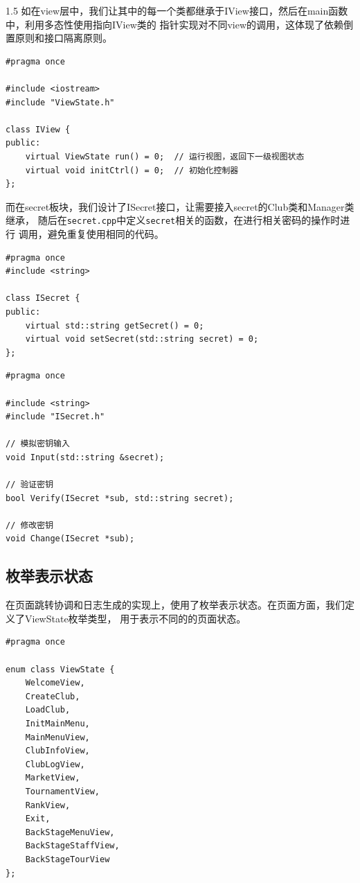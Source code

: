 \documentclass[a4paper]{article}
\begin{document}
\begin{spacing}{1.5}
            如在view层中，我们让其中的每一个类都继承于IView接口，然后在main函数中，利用多态性使用指向IView类的
            指针实现对不同view的调用，这体现了依赖倒置原则和接口隔离原则。

            \begin{lstlisting}[caption=IView接口定义]
#pragma once

#include <iostream>
#include "ViewState.h"

class IView {
public:
    virtual ViewState run() = 0;  // 运行视图，返回下一级视图状态
    virtual void initCtrl() = 0;  // 初始化控制器
};

            \end{lstlisting}
            而在secret板块，我们设计了ISecret接口，让需要接入secret的Club类和Manager类继承，
            随后在\verb|secret.cpp|中定义\verb|secret|相关的函数，在进行相关密码的操作时进行
            调用，避免重复使用相同的代码。

            \begin{lstlisting}[caption=ISecret接口定义]
#pragma once
#include <string>

class ISecret {
public:
    virtual std::string getSecret() = 0;
    virtual void setSecret(std::string secret) = 0;
};
            \end{lstlisting}

            \begin{lstlisting}[caption=secret相关函数声明]
#pragma once

#include <string>
#include "ISecret.h"

// 模拟密钥输入
void Input(std::string &secret);

// 验证密钥
bool Verify(ISecret *sub, std::string secret);

// 修改密钥
void Change(ISecret *sub);
            \end{lstlisting}

            

        \subsection{枚举表示状态}
            在页面跳转协调和日志生成的实现上，使用了枚举表示状态。在页面方面，我们定义了ViewState枚举类型，
            用于表示不同的的页面状态。
            \begin{lstlisting}[caption=ViewState枚举定义]
#pragma once

enum class ViewState {
    WelcomeView,
    CreateClub,
    LoadClub,
    InitMainMenu,
    MainMenuView,
    ClubInfoView,
    ClubLogView,
    MarketView,
    TournamentView,
    RankView,
    Exit,
    BackStageMenuView,
    BackStageStaffView,
    BackStageTourView
};
            \end{lstlisting}


\end{spacing}
\end{document}
